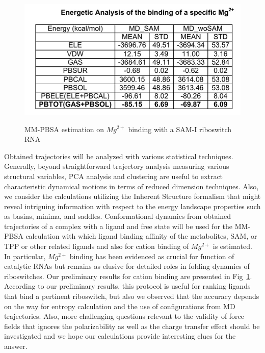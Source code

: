\documentclass[a4paper,11pt]{article}
\newcommand{\up}{\vspace*{-1em}}
\begin{document}
\begin{figure}%
\begin{center}
  \includegraphics[scale=0.4]{mm-pbsa-mg}
   \caption{MM-PBSA estimation on ${Mg^{2+}}$ binding with a SAM-I riboswitch RNA}
\up\up
\label{fig:mm-pbsa-mg-table}
\end{center}
\end{figure}

Obtained trajectories will be analyzed with various statistical techniques.  Generally, beyond straightforward trajectory analysis measuring various structural variables, PCA analysis and clustering are useful to extract characteristic dynamical motions in terms of reduced dimension techniques\cite{kimjpcb2010, SAM-I-NAR2009}.   Also, we consider the calculations utilizing the Inherent Structure formalism that might reveal intriguing information with respect to the energy landscape properties such as basins, minima, and saddles\cite{kimpre2002,kimjcp2004}.  Conformational dynamics from obtained trajectories of a complex with a ligand and free state will be used for the MM-PBSA calculation with which ligand binding affinity of the metabolites, SAM, or TPP or other related ligands and also for cation binding of ${Mg^{2+}}$ is estimated.  In particular, ${Mg^{2+}}$ binding has been evidenced as crucial for function of catalytic RNAs but remains as elusive for detailed roles in folding dynamics of riboswitches.  Our preliminary results for cation binding are presented in Fig~\ref{fig:mm-pbsa-mg-table}.  According to our preliminary results, this protocol is useful for ranking ligands that bind a pertinent riboswitch, but also we observed that the accuracy depends on the way for entropy calculation and the use of configurations from MD trajectories.  Also, more challenging questions relevant to the validity of force fields that ignores the polarizability as well as the charge transfer effect should be investigated and we hope our calculations provide interesting clues for the answer.      
\end{document}
